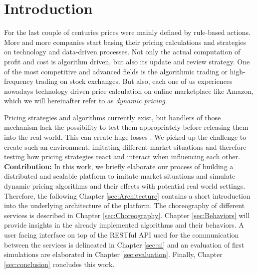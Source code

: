 %
\section{Introduction}
\label{sec:Introduction}
%
For the last couple of centuries prices were mainly defined by rule-based actions. More and more companies start basing their pricing calculations and strategies on technology and data-driven processes. Not only the actual computation of profit and cost is algorithm driven, but also its update and review strategy.
One of the most competitive and advanced fields is the algorithmic trading or high-frequency trading on stock exchanges. But also, each one of us experiences nowadays technology driven price calculation on online marketplace like Amazon, which we will hereinafter refer to as \emph{dynamic pricing}. 

Pricing strategies and algorithms currently exist, but handlers of those mechanism lack the possibility to test them appropriately before releasing them into the real world. This can create huge losses \citep{uflacker2016ertragsmanagement,schlosser2016optimal,schlosser2016stochastic,schlosser2016survive}. We picked up the challenge to create such an environment, imitating different market situations and therefore testing how pricing strategies react and interact when influencing each other.\\

\textbf{Contribution:} In this work, we briefly elaborate our process of building a distributed and scalable platform to imitate market situations and simulate dynamic pricing algorithms and their effects with potential real world settings.
Therefore, the following Chapter \ref{sec:Architecture} contains a short introduction into the underlying architecture of the platform.
The choreography of different services is described in Chapter \ref{sec:Choreography}. Chapter \ref{sec:Behaviors} will provide insights in the already implemented algorithms and their behaviors.
A user facing interface on top of the RESTful API used for the communication between the services is delineated in Chapter \ref{sec:ui} and an evaluation of first simulations are elaborated in Chapter \ref{sec:evaluation}. Finally, Chapter \ref{sec:conclusion} concludes this work. \\

%
%


